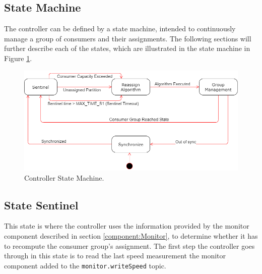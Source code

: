 \subsection{State Machine}

The controller can be defined by a state machine, intended to continuously
manage a group of consumers and their assignments. The following sections
will further describe each of the states, which are illustrated in the state
machine in Figure \ref{fig:state_machine}.

\begin{figure}[H] 
\centering
\includegraphics[width=\textwidth]{images/controller/state_machine.png}
\caption{Controller State Machine.} 
\label{fig:state_machine} 
\end{figure}

\subsection{State Sentinel}

This state is where the controller uses the information provided by the monitor
component described in section \ref{component:Monitor}, to determine whether it
has to recompute the consumer group's assignment. The first step the controller
goes through in this state is to read the last speed measurement the monitor
component added to the \lstinline{monitor.writeSpeed} topic.

